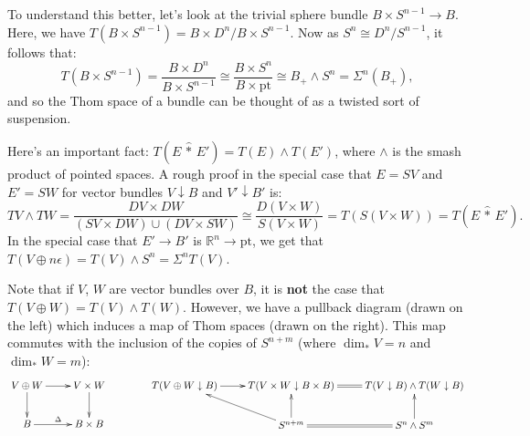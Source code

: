 \documentclass{article}
\newcommand{\R}{\mathbb{R}}
\newcommand{\sprod}{\wedge}
\newcommand{\wsum}{\vee}
\newcommand{\pt}[1]{#1_+}
\newcommand{\ptspace}{\mathrm{pt}}
\newcommand{\Suspend}{\Sigma}
\renewcommand{\to}{\longrightarrow}
\theoremstyle{definition}
\begin{document}
To understand this better, let's look at the trivial sphere bundle $B \times S^{n-1} \to B$.  Here, we have $T(B \times S^{n-1}) = B \times D^n / B \times S^{n-1}$.  Now as $S^n\cong D^n/S^{n-1}$, it follows that:
\[T(B \times S^{n-1}) = \frac{B \times D^n}{B \times S^{n-1}} \cong \frac{B \times S^n}{B \times \ptspace} \cong \pt{B} \sprod S^n = \Suspend^n(\pt{B}),\]
and so the Thom space of a bundle can be thought of as a twisted sort of suspension.

Here's an important fact: $T(E\, \widehat \ast\, E') = T(E) \sprod T(E')$, where $\sprod$ is the smash product of pointed spaces.  A rough proof in the special case that $E = SV$ and $E' = SW$ for vector bundles $V\downarrow B$ and $V'\downarrow B'$ is:
\[TV \sprod TW = \frac{DV \times DW}{(SV \times DW) \cup (DV \times SW)}\cong \frac{D(V \times W)}{S(V \times W)}= T(S(V \times W)) = T(E\,\widehat \ast\, E').\]
In the special case that $E' \to B'$ is $\R^n \to \ptspace$, we get that $T(V \oplus n \epsilon) = T(V) \sprod S^n = \Suspend^n T(V)$.

Note that if $V$, $W$ are vector bundles over $B$, it is \textbf{not} the case that $T(V\oplus W)=T(V)\wedge T(W)$. However, we have a pullback diagram (drawn on the left) which induces a map of Thom spaces (drawn on the right). This map commutes with the inclusion of the copies of $S^{n+m}$ (where $\dim_*V=n$ and $\dim_*W=m$):
\[\xymatrix{
V\oplus W\ar[d]\ar[r]&V\times W\ar[d]\\
B\ar[r]^\Delta&B\times B
}\qquad\qquad
\xymatrix{
T(V\oplus W\downarrow B)\ar[r]&T(V\times W\downarrow B\times B)
\ar@{=}[r]&T(V\downarrow B)\wedge T(W\downarrow B)\\
&S^{n+m}\ar[ul]\ar[u]\ar@{=}[r]&S^n\wedge S^{m}\ar[u]
}\]
\end{document}
